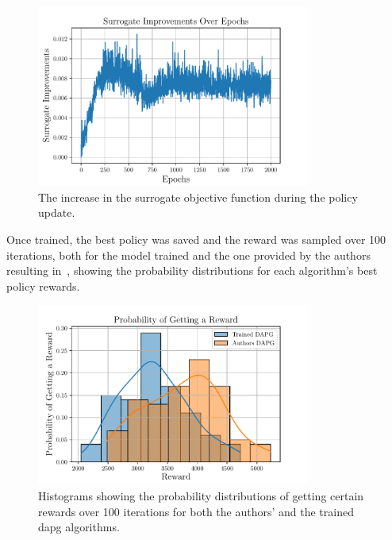 \begin{figure}[!h]
	\begin{center}
		\includegraphics[width=0.8\textwidth]{chapters/3-in-hand-manipulation/fig/surrogate-improvements-over-epochs.pdf}
	\end{center}
	\caption{The increase in the surrogate objective function during the policy update.}
	\label{fig:surrogate-improvements-over-epochs}
\end{figure}
\newpage
Once trained, the best policy was saved and the reward was sampled over \num{100} iterations, both for the model trained and the one provided by the authors resulting in~, showing the probability distributions for each algorithm's best policy rewards.
\newpage
\begin{figure}[!h]
	\begin{center}
		\includegraphics[width=0.8\textwidth]{chapters/3-in-hand-manipulation/fig/probability-of-getting-a-reward.pdf}
	\end{center}
	\caption{Histograms showing the probability distributions of getting certain rewards over \num{100} iterations for both the authors' and the trained \gls{dapg} algorithms.}
	\label{fig:probability-of-getting-a-reward}
\end{figure}

